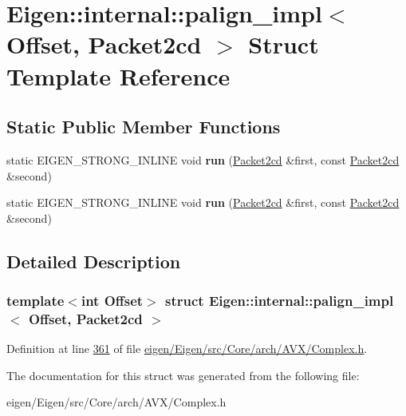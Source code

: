 \hypertarget{struct_eigen_1_1internal_1_1palign__impl_3_01_offset_00_01_packet2cd_01_4}{}\section{Eigen\+:\+:internal\+:\+:palign\+\_\+impl$<$ Offset, Packet2cd $>$ Struct Template Reference}
\label{struct_eigen_1_1internal_1_1palign__impl_3_01_offset_00_01_packet2cd_01_4}
\subsection*{Static Public Member Functions}
\begin{DoxyCompactItemize}
\item 
\mbox{\label{struct_eigen_1_1internal_1_1palign__impl_3_01_offset_00_01_packet2cd_01_4_a591e59857a9546b969896c00726c2312}} 
static E\+I\+G\+E\+N\+\_\+\+S\+T\+R\+O\+N\+G\+\_\+\+I\+N\+L\+I\+NE void {\bfseries run} (\hyperlink{struct_eigen_1_1internal_1_1_packet2cd}{Packet2cd} \&first, const \hyperlink{struct_eigen_1_1internal_1_1_packet2cd}{Packet2cd} \&second)
\item 
\mbox{\label{struct_eigen_1_1internal_1_1palign__impl_3_01_offset_00_01_packet2cd_01_4_a591e59857a9546b969896c00726c2312}} 
static E\+I\+G\+E\+N\+\_\+\+S\+T\+R\+O\+N\+G\+\_\+\+I\+N\+L\+I\+NE void {\bfseries run} (\hyperlink{struct_eigen_1_1internal_1_1_packet2cd}{Packet2cd} \&first, const \hyperlink{struct_eigen_1_1internal_1_1_packet2cd}{Packet2cd} \&second)
\end{DoxyCompactItemize}


\subsection{Detailed Description}
\subsubsection*{template$<$int Offset$>$\newline
struct Eigen\+::internal\+::palign\+\_\+impl$<$ Offset, Packet2cd $>$}



Definition at line \hyperlink{eigen_2_eigen_2src_2_core_2arch_2_a_v_x_2_complex_8h_source_l00361}{361} of file \hyperlink{eigen_2_eigen_2src_2_core_2arch_2_a_v_x_2_complex_8h_source}{eigen/\+Eigen/src/\+Core/arch/\+A\+V\+X/\+Complex.\+h}.



The documentation for this struct was generated from the following file\+:\begin{DoxyCompactItemize}
\item 
eigen/\+Eigen/src/\+Core/arch/\+A\+V\+X/\+Complex.\+h\end{DoxyCompactItemize}
